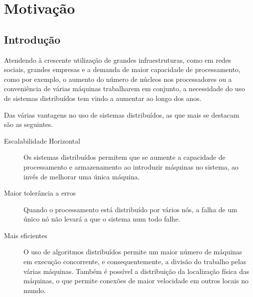\chapter{Motivação}
\label{chap:estado-da-arte}

\section{Introdução}
\label{chap2:sec:intro}



Atendendo à crescente utilização de grandes infraestruturas, como em redes sociais, grandes empresas e a demanda de maior capacidade de processamento, como por exemplo, o aumento do número de núcleos nos processadores ou a conveniência de várias máquinas trabalharem em conjunto, a necessidade do uso de sistemas distribuídos tem vindo a aumentar ao longo dos anos.

Das várias vantagens no uso de sistemas distribuídos, as que mais se destacam são as seguintes.
\begin{description}
    \item [Escalabilidade Horizontal] Os sistemas distribuídos permitem que se aumente a capacidade de processamento e armazenamento ao introduzir máquinas no sistema, ao invés de melhorar uma única máquina.
	
    \item [Maior tolerância a erros]Quando o processamento está distribuído por vários nós, a falha de um único nó não levará a que o sistema num todo falhe.

    \item [Mais eficientes] O uso de algoritmos distribuídos permite um maior número de máquinas em execução concorrente, e consequentemente, a divisão do trabalho pelas várias máquinas.
	Também é possível a distribuição da localização física das máquinas, o que permite conexões de maior velocidade em outros locais no mundo.

\end{description}

